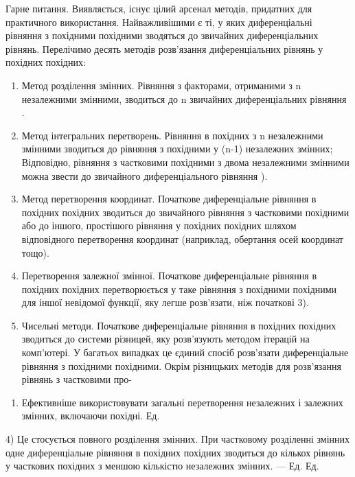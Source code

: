 Гарне питання. Виявляється, існує цілий арсенал методів, придатних для практичного використання. Найважливішими є ті, у яких диференціальні рівняння з похідними похідними зводяться до звичайних диференціальних рівнянь. Перелічимо десять методів розв'язання диференціальних рівнянь у похідних похідних:

\begin{enumerate}
\def\labelenumi{\arabic{enumi}.}
\item
  Метод розділення змінних. Рівняння з факторами, отриманими з n незалежними змінними, зводиться до n звичайних диференціальних рівняння .
\item
  Метод інтегральних перетворень. Рівняння в похідних з n незалежними змінними зводиться до рівняння з похідними у (n-1) незалежних змінних; Відповідно, рівняння з частковими похідними з двома незалежними змінними можна звести до звичайного диференціального рівняння ).
\item
  Метод перетворення координат. Початкове диференціальне рівняння в похідних похідних зводиться до звичайного рівняння з частковими похідними або до іншого, простішого рівняння у похідних похідних шляхом відповідного перетворення координат (наприклад, обертання осей координат тощо).
\item
  Перетворення залежної змінної. Початкове диференціальне рівняння в похідних похідних перетворюється у таке рівняння з похідними похідними для іншої невідомої функції, яку легше розв'язати, ніж початкові 3).
\item
  Чисельні методи. Початкове диференціальне рівняння в похідних похідних зводиться до системи різницей, яку розв'язують методом ітерацій на комп'ютері. У багатьох випадках це єдиний спосіб розв'язати диференціальне рівняння з похідними похідними. Окрім різницьких методів для розв'язання рівнянь з частковими про-
\end{enumerate}

\begin{enumerate}
\def\labelenumi{\alph{enumi})}
\setcounter{enumi}{4}
\tightlist
\item
  Ефективніше використовувати загальні перетворення незалежних і залежних змінних, включаючи похідні. Ед.
\end{enumerate}

4) Це стосується повного розділення змінних. При частковому розділенні змінних одне диференціальне рівняння в похідних похідних зводиться до кількох рівнянь у часткових похідних з меншою кількістю незалежних змінних. --- Ед. Ед.

